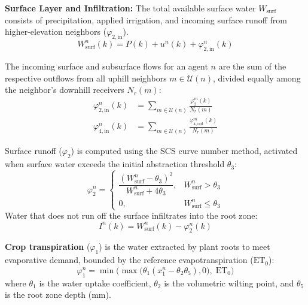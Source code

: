 \textbf{Surface Layer and Infiltration:} 
The total available surface water $W_{\text{surf}}$ consists of precipitation, applied irrigation, and incoming surface runoff from higher-elevation neighbors ($\varphi_{2,\text{in}}$). 
\begin{equation}
    W_{\text{surf}}^n(k) = P(k) + u^n(k) + \varphi_{2,\text{in}}^n(k)
    \label{eq:wsurf}
\end{equation}

The incoming surface and subsurface flows for an agent $n$ are the sum of the respective outflows from all uphill neighbors $m \in \mathcal{U}(n)$, divided equally among the neighbor's downhill receivers $N_r(m)$:
\begin{align}
    \varphi_{2,\text{in}}^n(k) &= \sum_{m \in \mathcal{U}(n)} \frac{\varphi_2^m(k)}{N_r(m)} \\
    \varphi_{4,\text{in}}^n(k) &= \sum_{m \in \mathcal{U}(n)} \frac{\varphi_{4,\text{out}}^m(k)}{N_r(m)}
\end{align}

Surface runoff ($\varphi_2$) is computed using the SCS curve number method, activated when surface water exceeds the initial abstraction threshold $\theta_3$:
\begin{equation}
    \varphi_2^n = 
    \begin{cases}
        \dfrac{(W_{\text{surf}}^n - \theta_3)^2}{W_{\text{surf}}^n + 4\theta_3}, & W_{\text{surf}}^n > \theta_3 \\[8pt]
        0, & W_{\text{surf}}^n \leq \theta_3
    \end{cases}
    \label{eq:phi2}
\end{equation}
Water that does not run off the surface infiltrates into the root zone:
\begin{equation}
    I^n(k) = W_{\text{surf}}^n(k) - \varphi_2^n(k)
    \label{eq:infiltration}
\end{equation}

\textbf{Crop transpiration} ($\varphi_1$) is the water extracted by plant roots to meet evaporative demand, bounded by the reference evapotranspiration ($\text{ET}_0$):
\begin{equation}
    \varphi_1^n = \min\!\Big(\max\!\big(\theta_1(x_1^n - \theta_2 \theta_5), 0\big),\; \text{ET}_0\Big)
    \label{eq:phi1}
\end{equation}
where $\theta_1$ is the water uptake coefficient, $\theta_2$ is the volumetric wilting point, and $\theta_5$ is the root zone depth (mm). 

